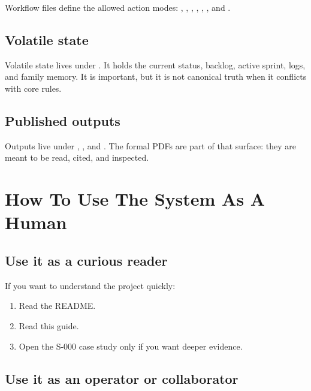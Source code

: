\documentclass[a4paper,11pt,openany]{report}
\begin{document}
Workflow files define the allowed action modes:
, , , ,
, , and .

\section{Volatile state}

Volatile state lives under . It holds the current status,
backlog, active sprint, logs, and family memory. It is important, but it is not
canonical truth when it conflicts with core rules.

\section{Published outputs}

Outputs live under , , and
. The formal PDFs are part of that surface: they are meant to be
read, cited, and inspected.


\chapter{How To Use The System As A Human}


\section{Use it as a curious reader}

If you want to understand the project quickly:

\begin{enumerate}
  \item Read the README.
  \item Read this guide.
  \item Open the S-000 case study only if you want deeper evidence.
\end{enumerate}

\section{Use it as an operator or collaborator}
\end{document}
